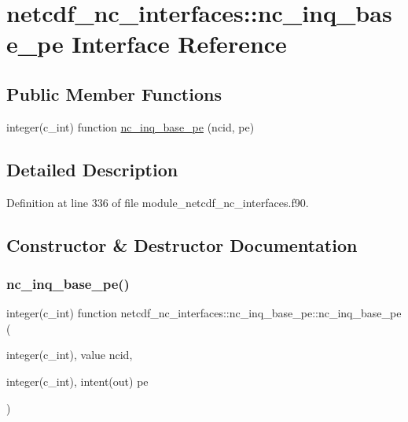 \hypertarget{interfacenetcdf__nc__interfaces_1_1nc__inq__base__pe}{}\section{netcdf\+\_\+nc\+\_\+interfaces\+:\+:nc\+\_\+inq\+\_\+base\+\_\+pe Interface Reference}
\label{interfacenetcdf__nc__interfaces_1_1nc__inq__base__pe}
\subsection*{Public Member Functions}
\begin{DoxyCompactItemize}
\item 
integer(c\+\_\+int) function \hyperlink{interfacenetcdf__nc__interfaces_1_1nc__inq__base__pe_a9df349af4db63c44c707088245ad2d8d}{nc\+\_\+inq\+\_\+base\+\_\+pe} (ncid, pe)
\end{DoxyCompactItemize}


\subsection{Detailed Description}


Definition at line 336 of file module\+\_\+netcdf\+\_\+nc\+\_\+interfaces.\+f90.



\subsection{Constructor \& Destructor Documentation}
\mbox{\label{interfacenetcdf__nc__interfaces_1_1nc__inq__base__pe_a9df349af4db63c44c707088245ad2d8d}} 
\subsubsection{\texorpdfstring{nc\+\_\+inq\+\_\+base\+\_\+pe()}{nc\_inq\_base\_pe()}}
{\footnotesize\ttfamily integer(c\+\_\+int) function netcdf\+\_\+nc\+\_\+interfaces\+::nc\+\_\+inq\+\_\+base\+\_\+pe\+::nc\+\_\+inq\+\_\+base\+\_\+pe (\begin{DoxyParamCaption}\item[{integer(c\+\_\+int), value}]{ncid,  }\item[{integer(c\+\_\+int), intent(out)}]{pe }\end{DoxyParamCaption})}



